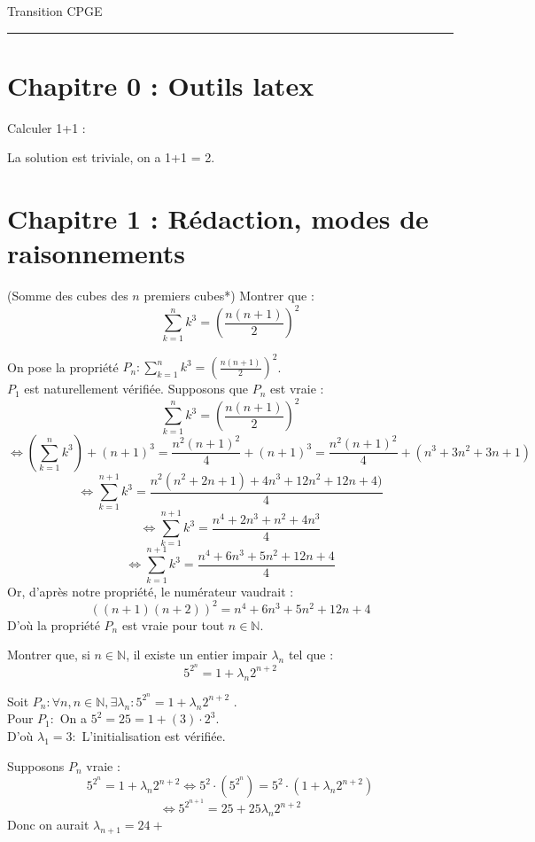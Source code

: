 \documentclass[12pt,letterpaper, onecolumn]{exam}
\newcommand*\circled[1]{\tikz[baseline=(char.base)]{
            \node[shape=circle,draw,inner sep=2pt] (char) {#1};}}
\begin{document}
\begingroup  
    \centering
    \LARGE Transition CPGE\\
\endgroup
\rule{\textwidth}{0.4pt}
\pointsdroppedatright
\printanswers
\renewcommand{\solutiontitle}[1]{\noindent\textbf{}\enspace} 

\newcommand{\answer}[1]{\begin{solution} #1 \end{solution}}

\begin{questions}

\section*{Chapitre 0 : Outils latex}

\question*[1] Calculer 1+1 \circled{0} :
    
\answer{La solution est triviale, on a 1+1 = 2.}
        
\newpage
 
 
 \section{Chapitre 1 :  Rédaction, modes de raisonnements}
 \setcounter{question}{0}
 \question[1] \circled{2} (Somme des cubes des $n$ premiers cubes*) Montrer que : 
 $$\sum_{k=1}^n k^3  = \left (\frac{n(n+1)}{2} \right)^2$$
 \answer{
On pose la propriété $P_n : \displaystyle \sum_{k=1}^n k^3  = \left (\frac{n(n+1)}{2} \right)^2$. \\
$P_1$ est naturellement vérifiée.
Supposons que $P_n$ est vraie :
$$\sum_{k=1}^n k^3  = \left (\frac{n(n+1)}{2} \right)^2$$
$$\iff  \left (\sum_{k=1}^n k^3 \right)  +(n+1)^3=\frac{n^2(n+1)^2}{4}  + (n+1)^3 = \frac{n^2(n+1)^2}{4}  + (n^3+3n^2+3n+1)$$
$$\iff  \sum_{k=1}^{n+1} k^3 = \frac{n^2(n^2 + 2n + 1) + 4n^3 +12n^2 + 12n+4)}{4} $$
$$\iff  \sum_{k=1}^{n+1} k^3=  \frac{n^4 + 2n^3 + n^2 + 4n^3 }{4}$$
$$\iff  \sum_{k=1}^{n+1} k^3=  \frac{n^4 + 6n^3 + 5n^2 + 12n + 4}{4}$$
Or, d'après notre propriété, le numérateur vaudrait :  $$ ((n+1)(n+2))^2 = n^4 + 6n^3+ 5n^2 + 12n + 4$$
D'où la propriété $P_n$ est vraie pour tout $n \in \mathbb{N}.$
 }
 
\question[1] \circled{2} Montrer que, si $n \in \mathbb{N}$, il existe un entier impair $\lambda_n$ tel que :
$$5^{2^n} = 1 + \lambda_n2^{n+2}$$
 
 \answer{
 Soit $P_n : \forall n, n \in \mathbb{N}, \exists \lambda_n : 5^{2^n} = 1 + \lambda_n 2^{n+2}$ .\\
 Pour $P_1 : $ On a $5^2 = 25 = 1 + (3) \cdot 2^3$. \\
D'où $\lambda_1 = 3 : $ L'initialisation est vérifiée.

Supposons $P_n$ vraie : 
 $$5^{2^n} = 1 + \lambda_n 2^{n+2} \iff 5^2 \cdot \left ( 5^{2^n}\right) = 5^2 \cdot \left (1 + \lambda_n 2^{n+2} \right)$$
 $$\iff 5^{2^{n+1}} = 25 + 25\lambda_n 2^{n+2}$$
 Donc on aurait $\lambda_{n+1} = 24 + $
 }
 
\end{questions}
\end{document}
